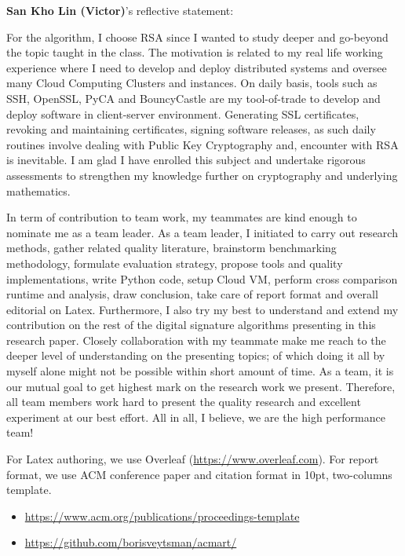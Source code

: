 \documentclass[10pt,sigconf]{acmart}
\begin{document}
\vspace{1em}

\noindent \textbf{San Kho Lin (Victor)}'s reflective statement:

For the algorithm, I choose RSA since I wanted to study deeper and go-beyond the topic taught in the class. The motivation is related to my real life working experience where I need to develop and deploy distributed systems and oversee many Cloud Computing Clusters and instances. On daily basis, tools such as SSH, OpenSSL, PyCA and BouncyCastle are my tool-of-trade to develop and deploy software in client-server environment. Generating SSL certificates, revoking and maintaining certificates, signing software releases, as such daily routines involve dealing with Public Key Cryptography and, encounter with RSA is inevitable. I am glad I have enrolled this subject and undertake rigorous assessments to strengthen my knowledge further on cryptography and underlying mathematics.

In term of contribution to team work, my teammates are kind enough to nominate me as a team leader. As a team leader, I initiated to carry out research methods, gather related quality literature, brainstorm benchmarking methodology, formulate evaluation strategy, propose tools and quality implementations, write Python code, setup Cloud VM, perform cross comparison runtime and analysis, draw conclusion, take care of report format and overall editorial on Latex. Furthermore, I also try my best to understand and extend my contribution on the rest of the digital signature algorithms presenting in this research paper. Closely collaboration with my teammate make me reach to the deeper level of understanding on the presenting topics; of which doing it all by myself alone might not be possible within short amount of time. As a team, it is our mutual goal to get highest mark on the research work we present. Therefore, all team members work hard to present the quality research and excellent experiment at our best effort. All in all, I believe, we are the high performance team!

\vspace{2em}

\noindent For Latex authoring, we use Overleaf (\url{https://www.overleaf.com}). For report format, we use ACM conference paper and citation format in 10pt, two-columns template.
\begin{itemize}
    \item \url{https://www.acm.org/publications/proceedings-template}
    \item \url{https://github.com/borisveytsman/acmart/}
\end{itemize}
\end{document}
